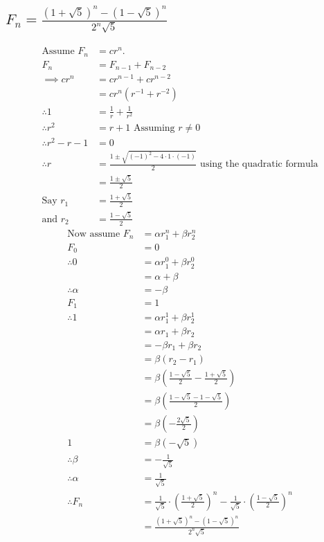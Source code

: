 \documentclass[11pt, oneside]{article}   	%
\begin{document}
	\subsection{$F_n = \frac{(1 + \sqrt 5)^n - (1 - \sqrt 5)^n}{2^n\sqrt 5}$}
		\begin{align*}
			\text{Assume }F_n &= cr^n.\\
			F_n  &= F_{n-1} + F_{n - 2}\\
			\implies cr^n &= cr^{n-1} + cr^{n-2}\\
			  &= cr^n(r^{-1} + r^{-2})\\
			\therefore 1 &= \frac{1}{r} + \frac{1}{r^2}\\
			\therefore r^2& = r + 1\text{ Assuming } r\ne 0\\
			\therefore r^2 - r - 1& = 0\\
			\therefore r &= \frac{1 \pm \sqrt{(-1)^2 - 4\cdot 1 \cdot (-1)}}{2} \text{ using the quadratic formula}\\
			  &= \frac{1\pm \sqrt{5}}{2}\\
			\text{Say }r_1 &= \frac{1+\sqrt 5}{2}\\
			\text{and } r_2 &= \frac{1 - \sqrt 5}{2}
		\end{align*}
		\begin{align*}
			\text{Now assume }F_n &= \alpha r_1^n + \beta r_2^n\\
			F_0 &= 0\\
			\therefore 0& = \alpha r_1^0 + \beta r_2^0\\
			& = \alpha + \beta\\
			\therefore \alpha &= -\beta\\
			F_1& = 1\\
			\therefore 1 &= \alpha r_1^1+\beta r_2^1\\
			  &= \alpha r_1+\beta r_2\\
			 & = -\beta r_1 + \beta r_2\\
			 & = \beta(r_2 - r_1)\\
			 & = \beta\left(\frac{1 - \sqrt 5}{2} - \frac{1 + \sqrt 5}{2}\right)\\
			  &= \beta\left(\frac{1 - \sqrt 5 -1 - \sqrt 5}{2}\right)\\
			 & = \beta\left(-\frac{2\sqrt 5}{2}\right)\\
			 1& = \beta\left(-\sqrt 5\right)\\
			\therefore \beta &= -\frac{1}{\sqrt 5}\\
			\therefore \alpha &= \frac{1}{\sqrt5}\\
			\therefore F_n &= \frac{1}{\sqrt 5}\cdot \left(\frac{1 + \sqrt 5}{2}\right)^n - \frac{1}{\sqrt 5} \cdot\left( \frac{1 - \sqrt 5}{2}\right)^n\\
			&= \frac{(1 + \sqrt 5)^n - (1 - \sqrt 5)^n}{2^n\sqrt 5}
		\end{align*}
\end{document}
